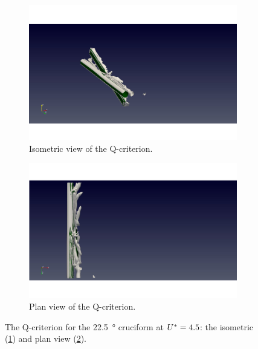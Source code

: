 \documentclass[oneside]{utmthesis}
\begin{document}
\begin{figure}
  \centering
  \begin{subfigure}[h]{0.9\textwidth}
    \includegraphics[width=\textwidth]{figs/qIso225U02}
    \caption{Isometric view of the Q-criterion.}
    \label{fig:qIso225U02}
  \end{subfigure}

  \begin{subfigure}[h]{0.9\textwidth}
    \includegraphics[width=\textwidth]{figs/qTop225U02}
    \caption{Plan view of the Q-criterion.}
    \label{fig:qTop225U02}
  \end{subfigure}

  \caption{The Q-criterion for the \SI{22.5}{\degree} cruciform at $U^{*} = 4.5$: the isometric (\ref{fig:qIso225U02}) and plan view (\ref{fig:qTop225U02}).} \label{fig:qCrit225U02}
\end{figure}
\end{document}
